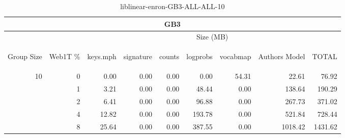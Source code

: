 \begin{center}
\begin{table}[htbp] 
 \begin{center}
\begin{tabular}{ | r | r | r | r | r | r | r | r | r |}
\hline
\multicolumn{9}{|c|}{GB3}\\
\hline
 & & \multicolumn{7}{|c|}{Size (MB)}\\ \cline{3-9}
\begin{sideways}Group Size\end{sideways} & \begin{sideways}Web1T \% \end{sideways} & \begin{sideways}keys.mph\end{sideways} & \begin{sideways}signature\end{sideways} & \begin{sideways}counts\end{sideways} & \begin{sideways}logprobs\end{sideways} & \begin{sideways}vocabmap\end{sideways} & \begin{sideways}Authors Model \end{sideways} & \begin{sideways}TOTAL\end{sideways}\\
\hline
\multirow{4}{*}{10}
 & 0 & 0.00 & 0.00 & 0.00 & 0.00 & 54.31 & 22.61 & 76.92\\ \cline{2-9}
 & 1 & 3.21 & 0.00 & 0.00 & 48.44 & 0.00 & 138.64 & 190.29\\ \cline{2-9}
 & 2 & 6.41 & 0.00 & 0.00 & 96.88 & 0.00 & 267.73 & 371.02\\ \cline{2-9}
 & 4 & 12.82 & 0.00 & 0.00 & 193.78 & 0.00 & 521.84 & 728.44\\ \cline{2-9}
 & 8 & 25.64 & 0.00 & 0.00 & 387.55 & 0.00 & 1018.42 & 1431.62\\ \cline{2-9}
\hline
\end{tabular}
\caption{liblinear-enron-GB3-ALL-ALL-10}
\label{table:liblinear-enron-GB3-ALL-ALL-10}
\end{center}
 \end{table}
\end{center}

